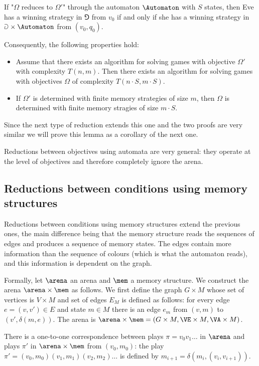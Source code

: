 \begin{lemma}
\label{1-lem:automata_reduction}
If "$\Omega$ reduces to $\Omega'$" through the automaton $\Automaton$ with $S$ states, then 
Eve has a winning strategy in $\Game$ from $v_0$ if and only if she has a winning strategy in $\Game \times \Automaton$ from $(v_0,q_0)$.

Consequently, the following properties hold:
\begin{itemize}
	\item Assume that there exists an algorithm for solving games with objective $\Omega'$ with complexity $T(n,m)$. 
	Then there exists an algorithm for solving games with objectives $\Omega$ of complexity $T(n \cdot S, m \cdot S)$.

	\item If $\Omega'$ is determined with finite memory strategies of size $m$, then $\Omega$ is determined with finite memory stragies of size $m \cdot S$.
\end{itemize}
\end{lemma}
Since the next type of reduction extends this one and the two proofs are very similar we will prove this lemma as a corollary of the next one.

Reductions between objectives using automata are very general: 
they operate at the level of objectives and therefore completely ignore the arena.

\subsection*{Reductions between conditions using memory structures}
Reductions between conditions using memory structures extend the previous ones, the main difference being that 
the memory structure reads the sequences of edges and produces a sequence of memory states.
The edges contain more information than the sequence of colours (which is what the automaton reads), 
and this information is dependent on the graph.

Formally, let $\arena$ an arena and $\mem$ a memory structure.
We construct the arena $\arena \times \mem$ as follows.
We first define the graph $G \times M$ whose set of vertices is $V \times M$ and set of edges $E_M$ is defined as follows:
for every edge $e = (v,v') \in E$ and state $m \in M$ there is an edge $e_m$ from $(v,m)$ to $(v',\delta(m,e))$.
The arena is $\arena \times \mem = (G \times M, \VE \times M, \VA \times M)$.

\begin{fact} 
There is a one-to-one correspondence between plays $\pi = v_0 v_1 \dots$ in $\arena$ 
and plays $\pi'$ in $\arena \times \mem$ from $(v_0,m_0)$:
the play $\pi' = (v_0, m_0) (v_1, m_1) (v_2, m_2) \ldots$
is defined by $m_{i+1} = \delta(m_i, (v_{i},v_{i+1}))$.
\end{fact}

